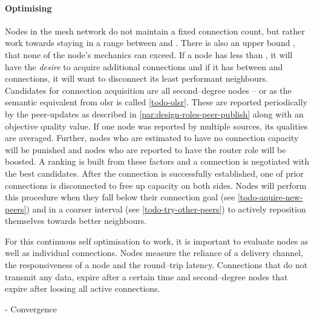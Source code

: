 \paragraph{Optimising}

Nodes in the mesh network do not maintain a fixed connection count, but rather work towards staying in a range between \minConnectionGoal and \maxConnectionGoal. There is also an upper bound \maxConnections, that none of the node's mechanics can exceed. If a node has less than \minConnectionGoal, it will have the \textit{desire} to acquire additional connections and if it has between \maxConnectionGoal and \maxConnections connections, it will want to disconnect its least performant neighbours. Candidates for connection acquisition are all second–degree nodes – or  as the semantic equivalent from \gls{olsr} is called \ref{todo-olsr}. These are reported periodically by the \glspl{peer-update} as described in \ref{par:design-roles-peer-publish} along with an objective quality value. If one node was reported by multiple sources, its qualities are averaged. Further, nodes who are estimated to have no connection capacity will be punished and nodes who are reported to have the router role will be boosted. A ranking is built from these factors and a connection is negotiated with the best candidates. After the connection is successfully established, one of prior connections is disconnected to free up capacity on both sides.
Nodes will perform this procedure when they fall below their connection goal \minConnectionGoal (see \ref{todo-aquire-new-peers}) and in a coarser interval (see \ref{todo-try-other-peers}) to actively reposition themselves towards better neighbours.

For this continuous self optimisation to work, it is important to evaluate nodes as well as individual connections. Nodes measure the reliance of a delivery channel, the responsiveness of a node and the round–trip latency. Connections that do not transmit any data, expire after a certain time and second–degree nodes that expire after loosing all active connections.

- Convergence
